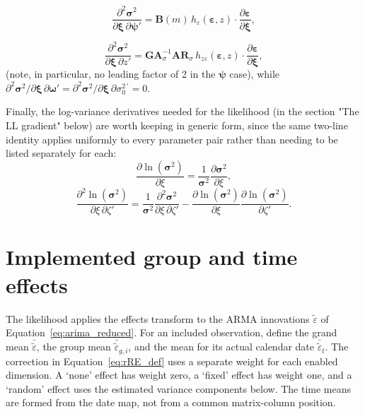 \documentclass[12pt]{article}
\begin{document}
\begin{equation}
\frac{\partial^{2}\mathbf{\sigma}^{2}}
{\partial \boldsymbol{\xi}\,\partial\mathbf{\psi}'}
=
\mathbf{B}(m)\,
h_{\varepsilon}\left(\mathbf{\varepsilon},z\right)\cdot
\frac{\partial \mathbf{\varepsilon}}{\partial \boldsymbol{\xi}},
\tag{47b}
\label{eq:47b}
\end{equation}

\begin{equation}
\frac{\partial^{2}\mathbf{\sigma}^{2}}
{\partial \boldsymbol{\xi}\,\partial z'}
=
\mathbf{GA}_{\sigma}^{-1}\mathbf{AR}_{\sigma}\,
h_{z\varepsilon}\left(\mathbf{\varepsilon},z\right)\cdot
\frac{\partial \mathbf{\varepsilon}}{\partial \boldsymbol{\xi}},
\tag{47c}
\label{eq:47c}
\end{equation}
(note, in particular, no leading factor of 2 in the $\boldsymbol{\psi}$ case), while $\partial^{2}\mathbf{\sigma}^{2}/\partial\boldsymbol{\xi}\,\partial\mathbf{\omega}' = \partial^{2}\mathbf{\sigma}^{2}/\partial\boldsymbol{\xi}\,\partial\sigma_{0}^{2\,\prime} = 0$.

Finally, the log-variance derivatives needed for the likelihood (in the section "The LL gradient" below) are worth keeping in generic form, since the same two-line identity applies uniformly to every parameter pair rather than needing to be listed separately for each:
\begin{equation}
\frac{\partial \ln(\mathbf{\sigma}^{2}) }{\partial\xi} = \frac{1}{\mathbf{\sigma}^{2}}\frac{\partial\mathbf{\sigma}^{2}}{\partial\xi},
\label{eq:49}
\end{equation}
\begin{equation}
\frac{\partial^{2}\ln(\boldsymbol{\sigma}^{2})}{\partial\xi\,\partial\zeta'} = \frac{1}{\boldsymbol{\sigma}^{2}}\frac{\partial^{2}\boldsymbol{\sigma}^{2}}{\partial\xi\,\partial\zeta'} - \frac{\partial\ln(\boldsymbol{\sigma}^{2})}{\partial\xi}\frac{\partial\ln(\boldsymbol{\sigma}^{2})}{\partial\zeta'}.
\label{eq:49b}
\end{equation}





\section{Implemented group and time effects}\label{sec:effects-implementation}

The likelihood applies the effects transform to the ARMA innovations $\tilde{\varepsilon}$ of Equation~\ref{eq:arima_reduced}. For an included observation, define the grand mean $\bar{\tilde{\varepsilon}}$, the group mean $\bar{\tilde{\varepsilon}}_{g,i}$, and the mean for its actual calendar date $\bar{\tilde{\varepsilon}}_{t}$. The correction in Equation~\ref{eq:rRE_def} uses a separate weight for each enabled dimension. A `none' effect has weight zero, a `fixed' effect has weight one, and a `random' effect uses the estimated variance components below. The time means are formed from the date map, not from a common matrix-column position.
\end{document}
